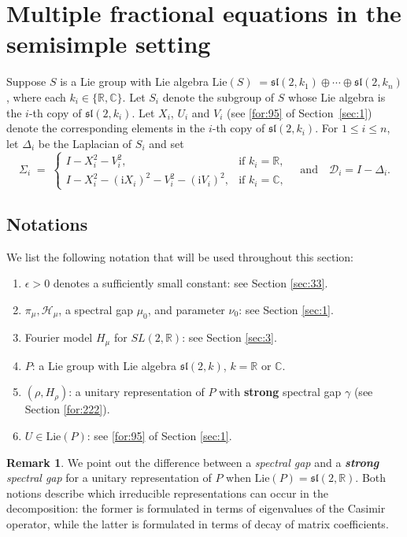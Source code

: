 \documentclass[11 pt]{amsart}
\newcommand{\RR}{\mathbb{R}}
\newcommand{\CC}{\mathbb{C}}
\theoremstyle{definition}
\newtheorem{remark}[theorem]{Remark}
\numberwithin{equation}{section}
\def\Lie{\mathrm{Lie}}
\begin{document}
\section{Multiple fractional equations in the semisimple setting}
Suppose $S$ is a Lie group with Lie algebra $\Lie(S)
  \;=\mathfrak{sl}(2,k_1)\oplus\cdots\oplus \mathfrak{sl}(2,k_n)$, where each $k_i\in\{\RR,\CC\}$. Let $S_i$ denote the subgroup of $S$ whose Lie
algebra is the $i$-th copy of $\mathfrak{sl}(2,k_i)$. Let $X_i$, $U_i$ and $V_i$
(see \eqref{for:95} of Section~\ref{sec:1}) denote the corresponding elements
in the $i$-th copy of $\mathfrak{sl}(2,k_i)$. For $1\le i\le n$, let $\Delta_i$ be the Laplacian of $S_i$ and set
\[
  \Sigma_i
  \;=\;
  \begin{cases}
    I - X_i^2 - V_i^2, &
      \text{if } k_i = \RR,\\[4pt]
    I - X_i^2 - (\mathrm{i}X_i)^2 - V_i^2 - (\mathrm{i}V_i)^2, &
      \text{if } k_i = \CC,
  \end{cases}\quad \text{and}\quad \mathcal{D}_i=I-\Delta_i.
\]

\subsection{Notations}\label{sec:43} We list the following notation that will be used throughout this section:
\begin{enumerate}
\item $\epsilon>0$ denotes a sufficiently small constant: see Section \ref{sec:33}.
  \item\label{for:80} $\pi_\mu,\mathcal{H}_\mu$, a spectral gap $\mu_0$,  and parameter $\nu_0$: see Section \ref{sec:1}.


\item Fourier model $H_\mu$ for $SL(2,\RR)$: see Section \ref{sec:3}.

  \item $P$:  a Lie group with Lie algebra $\mathfrak{sl}(2,k)$, $k=\RR$ or $\CC$.
   \item $(\rho,H_\rho)$: a unitary representation of $P$ with \textbf{strong} spectral gap $\gamma$ (see Section \ref{for:222}).

   \item $U\in\text{Lie}(P)$:  see \eqref{for:95} of Section \ref{sec:1}.
\end{enumerate}
\begin{remark}
We point out the difference between a \emph{spectral gap} and a \emph{\textbf{strong} spectral gap}
for a unitary representation of $P$ when $\Lie(P)=\mathfrak{sl}(2,\RR)$. Both
notions describe which irreducible representations can occur in the
decomposition: the former is formulated in terms of eigenvalues of the
Casimir operator, while the latter is formulated in terms of decay of matrix
coefficients.
\end{remark}
\end{document}
